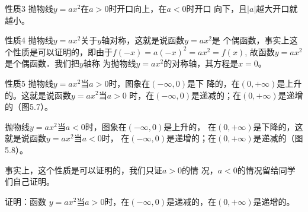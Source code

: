 \begin{blk}{性质3}
抛物线$y=ax^2$在$a>0$时开口向上，在$a<0$时开口
向下，且$|a|$越大开口就越小。
\end{blk}

\begin{blk}{性质4}
抛物线$y=ax^2$关于$y$轴对称，这就是说函数$y=ax^2$是
个偶函数，事实上这个性质是可以证明的，即由于$f(-x)=
a(-x)^2=ax^2=f(x)$, 故函数$y=ax^2$是个偶函数．我们把$y$轴称
为抛物线$y=ax^2$的对称轴，其方程是$x=0$。
\end{blk}

\begin{blk}{性质5}
抛物线$y=ax^2$当$a>0$时，图象在$(-\infty,0)$是下
降的，在$(0,+\infty)$是上升的。这就是说函数$y=ax^2$当$a>0$
时，在$(-\infty,0)$是递减的；在$(0,+\infty)$是递增的（图5.7）。

抛物线$y=ax^2$当$a<0$时，图象在$(-\infty,0)$是上升的，
在$(0,+\infty)$是下降的，这就是说函数$y=ax^2$当$a<0$时，
在$(-\infty,0)$是递增的；在$(0,+\infty)$是递减的（图5.8）。
\end{blk}

\begin{figure}[htp]\centering
    \begin{minipage}[t]{0.48\textwidth}
    \centering
{}
    \caption{}
    \end{minipage}
    \begin{minipage}[t]{0.48\textwidth}
    \centering
    \caption{}
    \end{minipage}
    \end{figure}

事实上，这个性质是可以证明的，我们只证$a>0$的情
况，$a<0$的情况留给同学们自己证明。

证明：函数 $y=ax^2$当$a>0$时，在$(-\infty,0)$是递减的，在$(0,+\infty)$是递增的。

